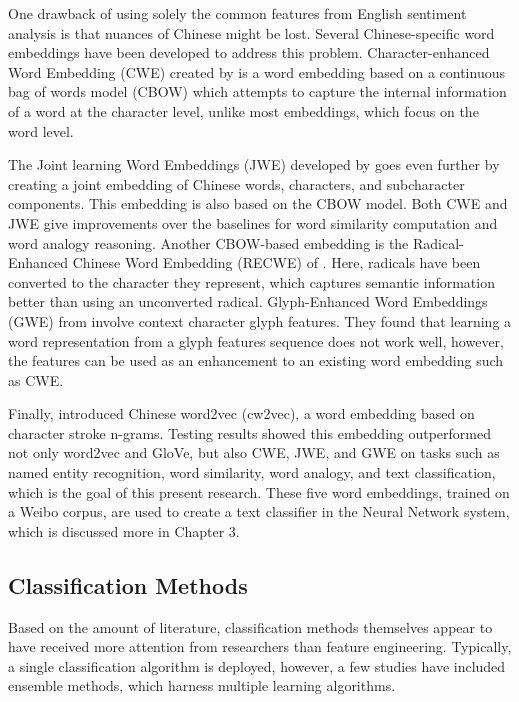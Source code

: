 \documentclass [11pt, proquest] {uwthesis}[2020/02/24]
\begin{document}
One drawback of using solely the common features from English sentiment analysis is that nuances of Chinese might be lost. Several Chinese-specific word embeddings have been developed to address this problem. Character-enhanced Word Embedding (CWE) created by \cite{Chen2015a} is a word embedding based on a continuous bag of words model (CBOW) which attempts to capture the internal information of a word at the character level, unlike most embeddings, which focus on the word level. 

The Joint learning Word Embeddings (JWE) developed by \citep{Yu2017} goes even further by creating a joint embedding of Chinese words, characters, and subcharacter components. This embedding is also based on the CBOW model. Both CWE and JWE give improvements over the baselines for word similarity computation and word analogy reasoning. Another CBOW-based embedding is the Radical-Enhanced Chinese Word Embedding (RECWE) of \cite{Chen2018}. Here, radicals have been converted to the character they represent, which captures semantic information better than using an unconverted radical. Glyph-Enhanced Word Embeddings (GWE) from \cite{Su2017} involve context character glyph features. They found that learning a word representation from a glyph features sequence does not work well, however, the features can be used as an enhancement to an existing word embedding such as CWE.

Finally, \cite{Cao2018} introduced Chinese word2vec (cw2vec), a word embedding based on character stroke n-grams. Testing results showed this embedding outperformed not only word2vec and GloVe, but also CWE, JWE, and GWE on tasks such as named entity recognition, word similarity, word analogy, and text classification, which is the goal of this present research. These five word embeddings, trained on a Weibo corpus, are used to create a text classifier in the Neural Network system, which is discussed more in Chapter 3.
\subsection{Classification Methods}
Based on the amount of literature, classification methods themselves appear to have received more attention from researchers than feature engineering. Typically, a single classification algorithm is deployed, however, a few studies have included ensemble methods, which harness multiple learning algorithms. 
\end{document}
